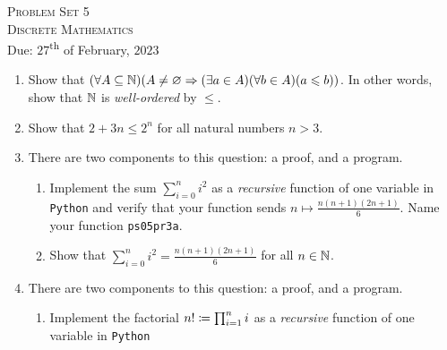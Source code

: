 




\begin{center}
    \textsc{\huge Problem Set 5}\\
    \textsc{Discrete Mathematics}\\
    {\color{gruvred}Due: $27$\textsuperscript{th} of February, $2023$}
\end{center}

\begin{enumerate}
    \item
        Show that $\pn*{\forall A \subseteq \N}
                        \pn*{A \neq \emptyset \implies \pn*{\exists a \in A}\pn*{\forall b \in A}\pn*{a \leq b}}$.
        In other words, show that $\mathbb{N}$ is \emph{well-ordered} by $\leq$.
    \item
        Show that $2 + 3n \leq 2^n$ for all natural numbers $n > 3$.
    \item
        There are two components to this question: a proof, and a program.
        \begin{enumerate}
            \item
                Implement the sum $\sum_{i = 0}^{n}i^2$
                as a \emph{recursive} function of one variable in \texttt{Python}
                and verify that your function sends $n \mapsto \frac{n(n + 1)(2n + 1)}{6}$.
                Name your function \texttt{ps05pr3a}.
            \item
                Show that $\displaystyle \sum_{i = 0}^{n}i^2 = \frac{n(n + 1)(2n + 1)}{6}$
                for all $n \in \mathbb{N}$.
        \end{enumerate}
    \item
        There are two components to this question: a proof, and a program.
        \begin{enumerate}
            \item
                Implement the factorial $n! \coloneqq \prod_{i = 1}^{n}i$
                as a \emph{recursive} function of one variable in \texttt{Python}

\end{enumerate}
\end{enumerate}
